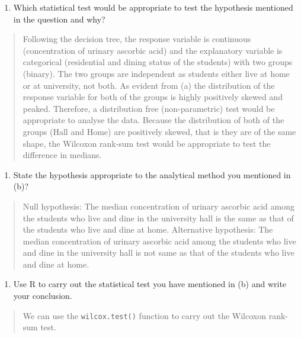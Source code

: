 \documentclass[
]{memoir}
\providecommand{\tightlist}{%
  \setlength{\itemsep}{0pt}\setlength{\parskip}{0pt}}
\begin{document}
\begin{enumerate}
\def\labelenumi{\alph{enumi})}
\setcounter{enumi}{1}
\tightlist
\item
  Which statistical test would be appropriate to test the hypothesis mentioned in the question and why?
\end{enumerate}

\begin{quote}
Following the decision tree, the response variable is continuous (concentration of urinary ascorbic acid) and the explanatory variable is categorical (residential and dining status of the students) with two groups (binary). The two groups are independent as students either live at home or at university, not both. As evident from (a) the distribution of the response variable for both of the groups is highly positively skewed and peaked. Therefore, a distribution free (non-parametric) test would be appropriate to analyse the data. Because the distribution of both of the groups (Hall and Home) are positively skewed, that is they are of the same shape, the Wilcoxon rank-sum test would be appropriate to test the difference in medians.
\end{quote}

\begin{enumerate}
\def\labelenumi{\alph{enumi})}
\setcounter{enumi}{2}
\tightlist
\item
  State the hypothesis appropriate to the analytical method you mentioned in (b)?
\end{enumerate}

\begin{quote}
Null hypothesis: The median concentration of urinary ascorbic acid among the students who live and dine in the university hall is the same as that of the students who live and dine at home.
Alternative hypothesis: The median concentration of urinary ascorbic acid among the students who live and dine in the university hall is not same as that of the students who live and dine at home.
\end{quote}

\begin{enumerate}
\def\labelenumi{\alph{enumi})}
\setcounter{enumi}{3}
\tightlist
\item
  Use R to carry out the statistical test you have mentioned in (b) and write your conclusion.
\end{enumerate}

\begin{quote}
We can use the \texttt{wilcox.test()} function to carry out the Wilcoxon rank-sum test.
\end{quote}
\end{document}

